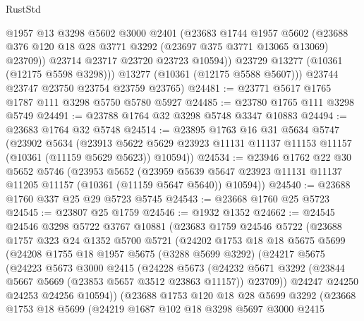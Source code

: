 \begin{lexlean}{RustStd}
\begin{coremodule}
              @1957
              @13
              @3298
              @5602
              @3000
              @2401
              (@23683
                @1744
                @1957
                @5602
                (@23688 @376 @120 @18 @28 @3771 @3292 (@23697 @375 @3771 @13065 @13069) @23709))
              @23714
              @23717
              @23720
              @23723
              @10594))
          @23729
          @13277
          (@10361 (@12175 @5598 @3298)))
        @13277
        (@10361 (@12175 @5588 @5607)))
      @23744
      @23747
      @23750
      @23754
      @23759
      @23765)
@24481 := @23771 @5617 @1765 @1787 @111 @3298 @5750 @5780 @5927
@24485 := @23780 @1765 @111 @3298 @5749
@24491 := @23788 @1764 @32 @3298 @5748 @3347 @10883
@24494 := @23683 @1764 @32 @5748
@24514 := @23895
    @1763
    @16
    @31
    @5634
    @5747
    (@23902
      @5634
      (@23913 @5622 @5629 @23923 @11131 @11137 @11153 @11157 (@10361 (@11159 @5629 @5623)) @10594))
@24534 := @23946
    @1762
    @22
    @30
    @5652
    @5746
    (@23953
      @5652
      (@23959 @5639 @5647 @23923 @11131 @11137 @11205 @11157 (@10361 (@11159 @5647 @5640)) @10594))
@24540 := @23688 @1760 @337 @25 @29 @5723 @5745
@24543 := @23668 @1760 @25 @5723
@24545 := @23807 @25 @1759
@24546 := @1932 @1352
@24662 := @24545
    @24546
    @3298
    @5722
    @3767
    @10881
    (@23683
      @1759
      @24546
      @5722
      (@23688
        @1757
        @323
        @24
        @1352
        @5700
        @5721
        (@24202
          @1753
          @18
          @18
          @5675
          @5699
          (@24208
            @1755
            @18
            @1957
            @5675
            (@3288 @5699 @3292)
            (@24217
              @5675
              (@24223
                @5673
                @3000
                @2415
                (@24228
                  @5673
                  (@24232
                    @5671
                    @3292
                    (@23844 @5667 @5669 (@23853 @5657 @3512 @23863 @11157))
                    @23709))
                @24247
                @24250
                @24253
                @24256
                @10594))
            (@23688
              @1753
              @120
              @18
              @28
              @5699
              @3292
              (@23668
                @1753
                @18
                @5699
                (@24219
                  @1687
                  @102
                  @18
                  @3298
                  @5697
                  @3000
                  @2415

\end{coremodule}
\end{lexlean}
